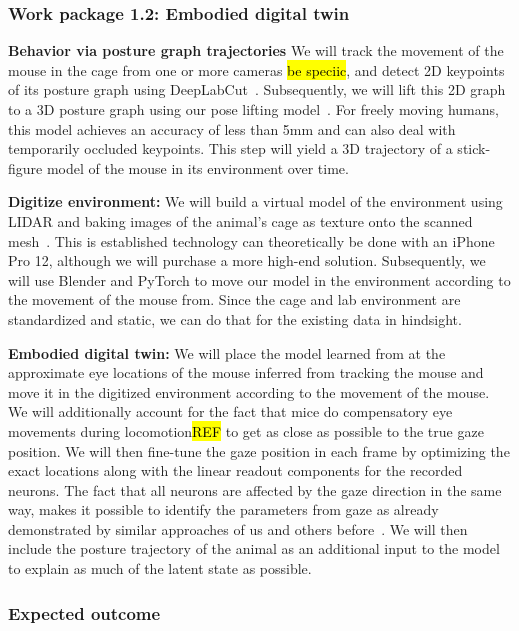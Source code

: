 \documentclass[B2,COG]{ercgrant}
\begin{document}
\subsubsection{Work package 1.2: Embodied digital twin\hfill{}}

\textbf{Behavior via posture graph trajectories}
We will track the movement of the mouse in the cage from one or more cameras \hl{be speciic}, and detect 2D keypoints of its posture graph using DeepLabCut~\parencite{Mathis2018-lk}. 
Subsequently, we will lift this 2D graph to a 3D posture graph using our pose lifting model~\parencite{Pierzchlewicz2022-tq}. 
For freely moving humans, this model achieves an accuracy of less than 5mm and can also deal with temporarily occluded keypoints. 
This step will yield a 3D trajectory of a stick-figure model of the mouse in its environment over time. 

\textbf{Digitize environment:} 
We will build a virtual model of the environment using LIDAR and baking images of the animal's cage as texture onto the scanned mesh~\parencite[similar as in][]{Holmgren2021-jv}.
This is established technology can theoretically be done with an iPhone Pro 12, although we will purchase a more high-end solution.
Subsequently, we will use Blender and PyTorch to move our model in the environment according to the movement of the mouse from.
Since the cage and lab environment are standardized and static, we can do that for the existing data in hindsight.

\textbf{Embodied digital twin:} We will place the model learned from  at the approximate eye locations of the mouse inferred from tracking the mouse and move it in the digitized environment according to the movement of the mouse. 
We will additionally account for the fact that mice do compensatory eye movements during locomotion\hl{REF} to get as close as possible to the true gaze position. 
We will then fine-tune the gaze position in each frame by optimizing the exact locations along with the linear readout components for the recorded neurons. 
The fact that all neurons are affected by the gaze direction in the same way, makes it possible to identify the parameters from gaze as already demonstrated by similar approaches of us and others before~\parencite{Sinz2018-sk,Walker2019-yw,Parker2022-ac}.
We will then include the posture trajectory of the animal as an additional input to the model to explain as much of the latent state as possible. 

\subsubsection{Expected outcome} 
\end{document}
